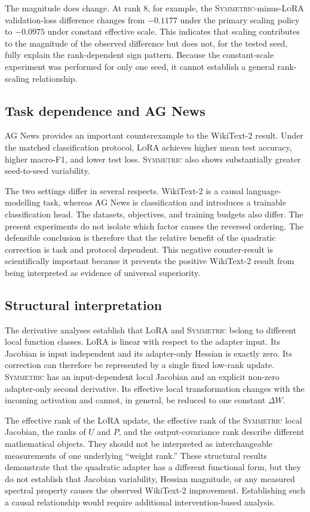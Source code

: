 \documentclass[11pt]{article}
\newcommand{\sym}{\textsc{Symmetric}}\newcommand{\lora}{\textsc{LoRA}}
\begin{document}
The magnitude does change. At rank 8, for example, the \sym{}-minus-\lora{} validation-loss difference changes from $-0.1177$ under the primary scaling policy to $-0.0975$ under constant effective scale. This indicates that scaling contributes to the magnitude of the observed difference but does not, for the tested seed, fully explain the rank-dependent sign pattern. Because the constant-scale experiment was performed for only one seed, it cannot establish a general rank-scaling relationship.

\subsection{Task dependence and AG News}
AG News provides an important counterexample to the WikiText-2 result. Under the matched classification protocol, \lora{} achieves higher mean test accuracy, higher macro-F1, and lower test loss. \sym{} also shows substantially greater seed-to-seed variability.

The two settings differ in several respects. WikiText-2 is a causal language-modelling task, whereas AG News is classification and introduces a trainable classification head. The datasets, objectives, and training budgets also differ. The present experiments do not isolate which factor causes the reversed ordering. The defensible conclusion is therefore that the relative benefit of the quadratic correction is task and protocol dependent. This negative counter-result is scientifically important because it prevents the positive WikiText-2 result from being interpreted as evidence of universal superiority.

\subsection{Structural interpretation}
The derivative analyses establish that \lora{} and \sym{} belong to different local function classes. \lora{} is linear with respect to the adapter input. Its Jacobian is input independent and its adapter-only Hessian is exactly zero. Its correction can therefore be represented by a single fixed low-rank update. \sym{} has an input-dependent local Jacobian and an explicit non-zero adapter-only second derivative. Its effective local transformation changes with the incoming activation and cannot, in general, be reduced to one constant $\Delta W$.

The effective rank of the \lora{} update, the effective rank of the \sym{} local Jacobian, the ranks of $U$ and $P$, and the output-covariance rank describe different mathematical objects. They should not be interpreted as interchangeable measurements of one underlying ``weight rank.'' These structural results demonstrate that the quadratic adapter has a different functional form, but they do not establish that Jacobian variability, Hessian magnitude, or any measured spectral property causes the observed WikiText-2 improvement. Establishing such a causal relationship would require additional intervention-based analysis.
\end{document}
